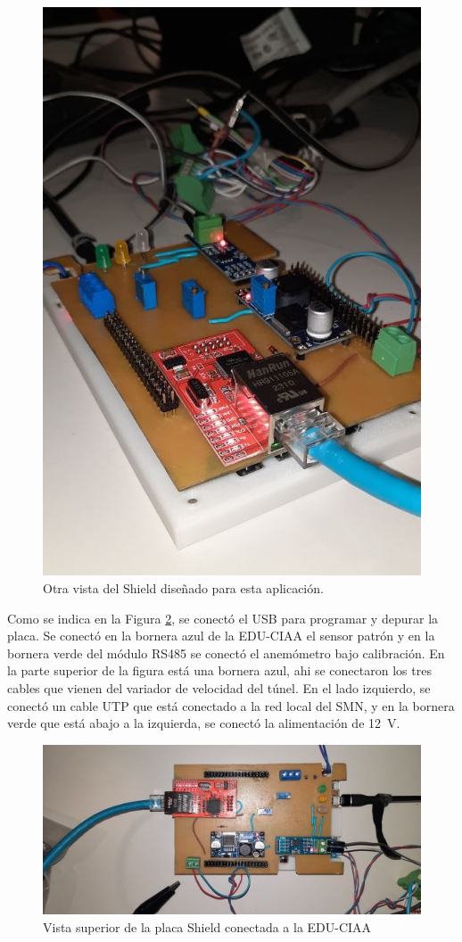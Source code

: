 \begin{figure}[H]
    \centering
    \includegraphics[width=0.5\linewidth]{Figuras/datalogger/Hardware/poncho2.jpg}
    \caption{Otra vista del Shield diseñado para esta aplicación.}
    \label{fig:poncho2}
\end{figure}

Como se indica en la Figura \ref{fig:poncho3}, se conectó el USB para programar y depurar la placa. Se conectó en la bornera azul de la EDU-CIAA el sensor patrón y en la bornera verde del módulo RS485 se conectó el anemómetro bajo calibración. En la parte superior de la figura está una  bornera azul, ahi se conectaron los tres cables que vienen del variador de velocidad del túnel. En el lado izquierdo, se conectó un cable UTP que está conectado a la red local del SMN, y en la bornera verde que está abajo a la izquierda,  se conectó la alimentación de \SI{12}{\volt}.

\begin{figure}[H]
    \centering
    \includegraphics[width=1\linewidth]{Figuras/datalogger/Hardware/poncho3.jpg}
    \caption{Vista superior de la placa Shield conectada a la EDU-CIAA}
    \label{fig:poncho3}
\end{figure}

